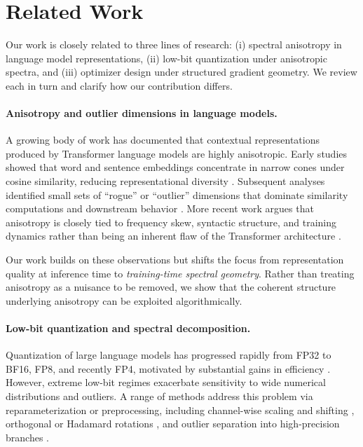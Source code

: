 \section{Related Work}
\label{sec:related_work}

Our work is closely related to three lines of research:
(i) spectral anisotropy in language model representations,
(ii) low-bit quantization under anisotropic spectra,
and (iii) optimizer design under structured gradient geometry.
We review each in turn and clarify how our contribution differs.

\paragraph{Anisotropy and outlier dimensions in language models.}
A growing body of work has documented that contextual representations produced
by Transformer language models are highly anisotropic.
Early studies showed that word and sentence embeddings concentrate in narrow
cones under cosine similarity, reducing representational diversity
\citep{arora2017simple,mu2017allbutthetop,ethayarajh2019contextual}.
Subsequent analyses identified small sets of ``rogue'' or ``outlier'' dimensions
that dominate similarity computations and downstream behavior
\citep{timkey2021rogue,kovaleva2021bertbusters,puccetti2022frequency}.
More recent work argues that anisotropy is closely tied to frequency skew,
syntactic structure, and training dynamics rather than being an inherent flaw
of the Transformer architecture \citep{rudman2023stable,machina2024anisotropy}.

Our work builds on these observations but shifts the focus from representation
quality at inference time to \emph{training-time spectral geometry}.
Rather than treating anisotropy as a nuisance to be removed, we show that the
coherent structure underlying anisotropy can be exploited algorithmically.

\paragraph{Low-bit quantization and spectral decomposition.}
Quantization of large language models has progressed rapidly from FP32 to BF16,
FP8, and recently FP4, motivated by substantial gains in efficiency
\citep{micikevicius2022fp8,peng2023fp8,perez2023fp8}.
However, extreme low-bit regimes exacerbate sensitivity to wide numerical
distributions and outliers.
A range of methods address this problem via reparameterization or preprocessing,
including channel-wise scaling and shifting \citep{xiao2023smoothquant,wei2023outlier},
orthogonal or Hadamard rotations \citep{suresh2017distributed,ashkboos2024quarot,ashkboos2025halo},
and outlier separation into high-precision branches \citep{li2024svdquant}.

